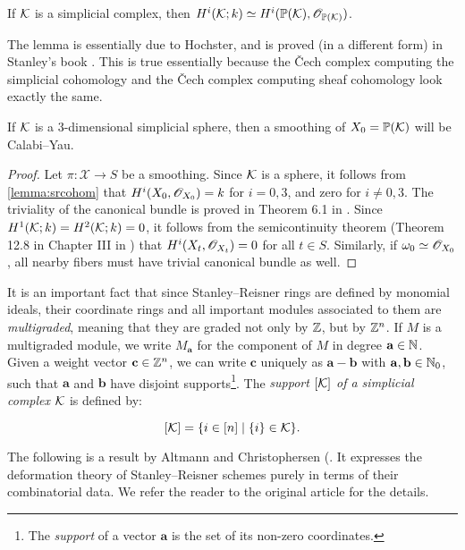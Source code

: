 \begin{lemma}
\label{lemma:srcohom}
If $\mathcal{K}$ is a simplicial complex, then $H^i(\mathcal{K};k) \simeq H^i(\mathbb{P}(\mathcal{K}),\mathscr{O}_{\mathbb{P}(\mathcal{K})})$.
\end{lemma}
The lemma is essentially due to Hochster, and is proved (in a different form) in Stanley's book \cite{stanley_green}. This is true essentially because the \v{C}ech complex computing the simplicial cohomology and the \v{C}ech complex computing sheaf cohomology look exactly the same.

\begin{lemma}
If $\mathcal{K}$ is a 3-dimensional simplicial sphere, then a smoothing of $X_0=\mathbb{P}(\mathcal{K})$ will be Calabi--Yau.
\end{lemma}
\begin{proof}
Let $\pi:\mathscr X \to S$ be a smoothing. Since $\mathcal{K}$ is a sphere, it follows from \cref{lemma:srcohom} that $H^i(X_0,\mathscr{O}_{X_0})=k$ for $i=0,3$, and zero for $i \neq 0,3$. The triviality of the canonical bundle is proved in Theorem 6.1 in \cite{eisenbud_graphcurves}. Since $H^1(\mathcal{K};k)=H^2(\mathcal{K};k)=0$, it follows from the semicontinuity theorem (Theorem 12.8 in Chapter III in \cite{hartshorne}) that $H^i(X_t,\mathscr{O}_{X_t})=0$ for all $t \in S$. Similarly, if $\omega_0 \simeq \mathscr{O}_{X_0}$, all nearby fibers must have trivial canonical bundle as well.
\end{proof}

It is an important fact that since Stanley--Reisner rings are defined by monomial ideals, their coordinate rings and all important modules associated to them are \emph{multigraded}, meaning that they are graded not only by $\mathbb{Z}$, but by $\mathbb{Z}^n$. If $M$ is a multigraded module, we write $M_{\mathbf a}$ for the component of $M$ in degree $\mathbf a \in \mathbb{N}$. Given a weight vector $\mathbf c \in \mathbb{Z}^n$, we can write $\mathbf c$ uniquely as $\mathbf a - \mathbf b$ with $\mathbf a, \mathbf b \in \mathbb{N}_0$, such that $\mathbf a$ and $\mathbf b$ have disjoint supports\footnote{The \emph{support} of a vector $\mathbf a$ is the set of its non-zero coordinates.}. The \emph{support $[\mathcal{K}]$ of a simplicial complex $\mathcal{K}$} is defined by:

\[
[\mathcal{K}] = \{ i \in [n] \mid \{ i\} \in \mathcal{K} \}.
\]

The following is a result by Altmann and Christophersen (\cite[Theorem 4.6]{deforming_christophersen}. It expresses the deformation theory of Stanley--Reisner schemes purely in terms of their combinatorial data. We refer the reader to the original article for the details.

